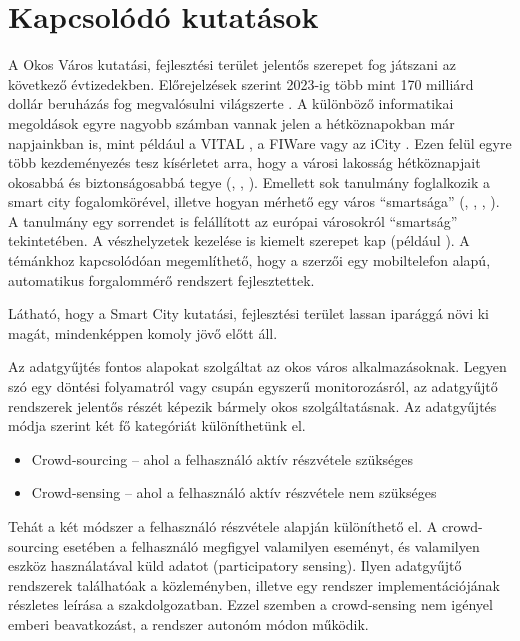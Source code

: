 \documentclass[a4paper,12pt]{report}
\begin{document}
\chapter{Kapcsolódó kutatások}

A Okos Város kutatási, fejlesztési terület jelentős szerepet fog játszani az következő évtizedekben. Előrejelzések szerint 2023-ig több mint 170 milliárd dollár beruházás fog megvalósulni világszerte \cite{navigant}. A különböző informatikai megoldások egyre nagyobb számban vannak jelen a hétköznapokban már napjainkban is, mint például a VITAL \cite{vital}, a FI\-Ware \cite{fiware} vagy az iCity \cite{icity}. Ezen felül egyre több kezdeményezés tesz kísérletet arra, hogy a városi lakosság hétköznapjait okosabbá és biztonságosabbá tegye (\cite{smartsantander}, \cite{futureglasgow}, \cite{myneighbourhood}). Emellett sok tanulmány foglalkozik a smart city fogalomkörével, illetve hogyan mérhető egy város ``smartsága'' (\cite{yamauchi2014development}, \cite{neirotti2014current}, \cite{de2014smart}, \cite{carli2013measuring}). A \cite{giffinger2007smart} tanulmány egy sorrendet is felállított az európai városokról ``smartság'' tekintetében. A vészhelyzetek kezelése is kiemelt szerepet kap (például \cite{du2012research}). A témánkhoz kapcsolódóan megemlíthető, hogy a \cite{mohan2008nericell} szerzői egy mobiltelefon alapú, automatikus forgalommérő rendszert fejlesztettek.

Látható, hogy a Smart City kutatási, fejlesztési terület lassan iparággá növi ki magát, mindenképpen komoly jövő előtt áll.

Az adatgyűjtés fontos alapokat szolgáltat az okos város alkalmazásoknak. Legyen szó egy döntési folyamatról vagy csupán egyszerű monitorozásról, az adatgyűjtő rendszerek jelentős részét képezik bármely okos szolgáltatásnak. Az adatgyűjtés módja szerint két fő kategóriát különíthetünk el.

\begin{itemize}
\item Crowd-sourcing -- ahol a felhasználó aktív részvétele szükséges
\item Crowd-sensing -- ahol a felhasználó aktív részvétele nem szükséges
\end{itemize}

Tehát a két módszer a felhasználó részvétele alapján különíthető el. A crowd-sourcing esetében a felhasználó megfigyel valamilyen eseményt, és valamilyen eszköz használatával küld adatot (participatory sensing). Ilyen adatgyűjtő rendszerek találhatóak a \cite{szabo2013framework} közleményben, illetve egy rendszer implementációjának részletes leírása a \cite{besenczi2013kozossegi} szakdolgozatban. Ezzel szemben a crowd-sensing nem igényel emberi beavatkozást, a rendszer autonóm módon működik.
\end{document}
